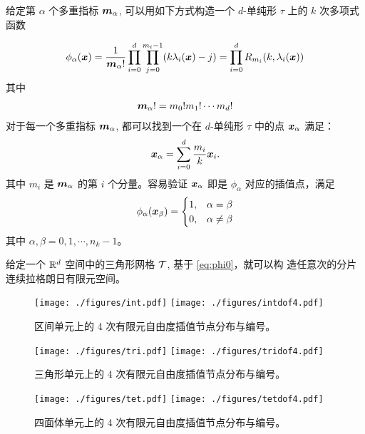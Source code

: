 \documentclass{article}
\begin{document}
给定第 $\alpha$ 个多重指标 ${\boldsymbol m}_\alpha$, 可以用如下方式构造一个 $d$-单纯形
$\tau$ 上的 $k$ 次多项式函数

\begin{equation}
    \phi_{\alpha}({\boldsymbol x}) = \frac{1}{{\boldsymbol m}_\alpha!}\prod_{i=0}^{d}\prod_{j =
    0}^{m_i - 1} (k\lambda_i({\boldsymbol x}) - j) = \prod_{i=0}^dR_{m_i}(k, \lambda_i({\boldsymbol x}))
    \label{eq:phi0}
\end{equation}
其中
\begin{align*}
    {\boldsymbol m}_\alpha! = m_0!m_1!\cdots m_d! 
\end{align*}
对于每一个多重指标 ${\boldsymbol m}_\alpha$, 都可以找到一个在 $d$-单纯形 $\tau$ 中的点
${\boldsymbol x}_\alpha$ 满足：
\begin{equation*}
    {\boldsymbol x}_\alpha = \sum_{i=0}^d \frac{m_i}{k} {\boldsymbol x}_i. 
\end{equation*}
其中 $m_i$ 是 ${\boldsymbol m}_\alpha$ 的第 $i$ 个分量。容易验证 ${\boldsymbol x}_\alpha$ 即是
$\phi_{\alpha}$ 对应的插值点，满足 
\begin{equation}
    \phi_\alpha({\boldsymbol x}_\beta) = 
    \begin{cases}
        1, & \alpha = \beta\\
        0, & \alpha \ne \beta
    \end{cases}
    \label{eq:phi1}
\end{equation}
其中 $\alpha, \beta = 0, 1, \cdots, n_k-1$。 

给定一个 ${\mathbb R}^d$ 空间中的三角形网格 ${\mathcal T}$, 基于 \eqref{eq:phi0}，就可以构
造任意次的分片连续拉格朗日有限元空间。

\begin{figure}[ht]
    \centering
    \texttt{[image: ./figures/int.pdf]}
    \texttt{[image: ./figures/intdof4.pdf]}
    \caption{区间单元上的 4 次有限元自由度插值节点分布与编号。}
    \label{fig:int4}
\end{figure}

\begin{figure}[ht]
    \centering
    \texttt{[image: ./figures/tri.pdf]}
    \texttt{[image: ./figures/tridof4.pdf]}
    \caption{三角形单元上的 4 次有限元自由度插值节点分布与编号。}
    \label{fig:tri4}
\end{figure}

\begin{figure}[ht]
    \centering
    \texttt{[image: ./figures/tet.pdf]}
    \texttt{[image: ./figures/tetdof4.pdf]}
    \caption{四面体单元上的 4 次有限元自由度插值节点分布与编号。}
    \label{fig:tet4}
\end{figure}
\newpage 
\end{document}
